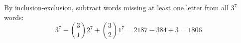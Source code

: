 By inclusion-exclusion, subtract words missing at least one letter from all $3^7$ words:
\[3^7-\binom31 2^7+\binom32 1^7=2187-384+3=\boxed{1806}.\]
